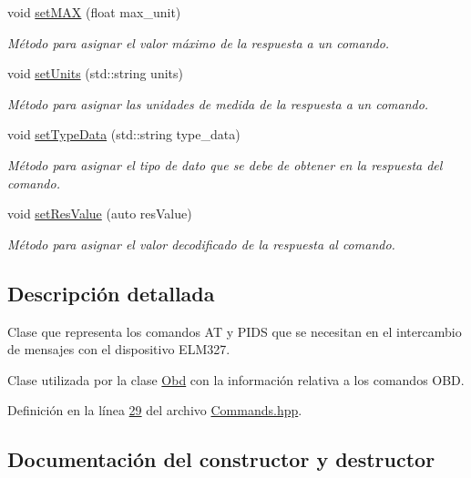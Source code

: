 \begin{DoxyCompactItemize}
void \hyperlink{classCommands_a364530a20f17fb20420c5980b1b07ea2}{set\+M\+AX} (float max\+\_\+unit)
\begin{DoxyCompactList}\small\item\em Método para asignar el valor máximo de la respuesta a un comando. \end{DoxyCompactList}\item 
void \hyperlink{classCommands_a35d92f904b7e1d2e806f7f7d92b23952}{set\+Units} (std\+::string units)
\begin{DoxyCompactList}\small\item\em Método para asignar las unidades de medida de la respuesta a un comando. \end{DoxyCompactList}\item 
void \hyperlink{classCommands_a1b2c552b493828ef9465d153809be3f2}{set\+Type\+Data} (std\+::string type\+\_\+data)
\begin{DoxyCompactList}\small\item\em Método para asignar el tipo de dato que se debe de obtener en la respuesta del comando. \end{DoxyCompactList}\item 
void \hyperlink{classCommands_a5c8eb30ed986a5071daf5f1135c2eb15}{set\+Res\+Value} (auto res\+Value)
\begin{DoxyCompactList}\small\item\em Método para asignar el valor decodificado de la respuesta al comando. \end{DoxyCompactList}\end{DoxyCompactItemize}


\subsection{Descripción detallada}
Clase que representa los comandos AT y P\+I\+DS que se necesitan en el intercambio de mensajes con el dispositivo E\+L\+M327. 

Clase utilizada por la clase \hyperlink{classObd}{Obd} con la información relativa a los comandos O\+BD. 

Definición en la línea \hyperlink{Commands_8hpp_source_l00029}{29} del archivo \hyperlink{Commands_8hpp_source}{Commands.\+hpp}.



\subsection{Documentación del constructor y destructor}
\mbox{\label{classCommands_ad71a0aafa9f942580b6c316ca07aef48}} 
